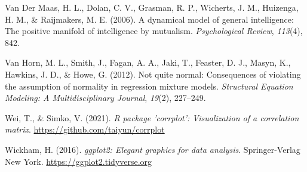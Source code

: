 \documentclass[
  man,floatsintext]{apa7}
\newlength{\cslhangindent}
\newlength{\cslentryspacingunit} %
\newenvironment{CSLReferences}[2] %
 {%
  \setlength{\parindent}{0pt}
  \ifodd #1
  \let\oldpar\par
  \def\par{\hangindent=\cslhangindent\oldpar}
  \fi
  \setlength{\parskip}{#2\cslentryspacingunit}
 }%
 {}
\begin{document}
\begin{CSLReferences}{1}{0}
\leavevmode{}%
Van Der Maas, H. L., Dolan, C. V., Grasman, R. P., Wicherts, J. M., Huizenga, H. M., \& Raijmakers, M. E. (2006). A dynamical model of general intelligence: The positive manifold of intelligence by mutualism. \emph{Psychological Review}, \emph{113}(4), 842.

\leavevmode{}%
Van Horn, M. L., Smith, J., Fagan, A. A., Jaki, T., Feaster, D. J., Masyn, K., Hawkins, J. D., \& Howe, G. (2012). Not quite normal: Consequences of violating the assumption of normality in regression mixture models. \emph{Structural Equation Modeling: A Multidisciplinary Journal}, \emph{19}(2), 227--249.

\leavevmode{}%
Wei, T., \& Simko, V. (2021). \emph{R package 'corrplot': Visualization of a correlation matrix}. \url{https://github.com/taiyun/corrplot}

\leavevmode{}%
Wickham, H. (2016). \emph{ggplot2: Elegant graphics for data analysis}. Springer-Verlag New York. \url{https://ggplot2.tidyverse.org}

\end{CSLReferences}
\end{document}
